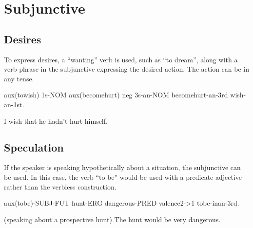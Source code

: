 \section{Subjunctive}

\subsection{Desires}

To express desires, a ``wanting'' verb is used, such as ``to dream'', along with
a verb phrase in the subjunctive expressing the desired action. The action can
be in any tense.

aux(towish) 1s-NOM aux(becomehurt) neg 3s-an-NOM becomehurt-an-3rd wish-an-1st.

I wish that he hadn't hurt himself.

\subsection{Speculation}

If the speaker is speaking hypothetically about a situation, the subjunctive can
be used. In this case, the verb ``to be'' would be used with a predicate
adjective rather than the verbless construction.

aux(tobe)-SUBJ-FUT hunt-ERG dangerous-PRED valence2->1 tobe-inan-3rd.

(speaking about a prospective hunt) The hunt would be very dangerous.
